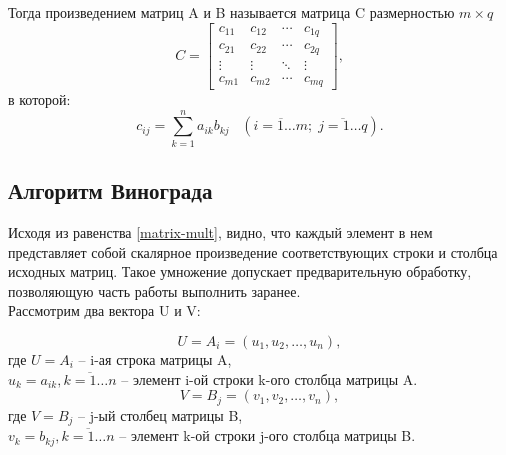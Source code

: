 \documentclass[12pt, a4paper]{report}
\begin{document}
	Тогда произведением матриц A и B называется матрица C размерностью  $m \times q$ 
	\begin{equation}
	\label{matrix-mult}
	C = \begin{bmatrix} 
	c_{11} & c_{12} & \cdots & c_{1q} \\
	c_{21} & c_{22} & \cdots & c_{2q} \\ 
	\vdots & \vdots & \ddots & \vdots \\ 
	c_{m1} & c_{m2} & \cdots & c_{mq}	
	\end{bmatrix},
	\end{equation}
	в которой:
	$$c_{ij} = \sum_{k=1}^n a_{ik}b_{kj} \;\;\; \left(\overline{i = 1 \ldots m};\;\overline{j = 1 \ldots q} \right).$$

	\subsection{Алгоритм Винограда}
	Исходя из равенства \ref{matrix-mult}, видно, что каждый элемент в нем представляет собой скалярное произведение соответствующих строки и столбца исходных матриц. Такое умножение допускает предварительную обработку, позволяющую часть работы выполнить заранее.\\
	Рассмотрим два вектора U и V:
	
	\begin{equation}
	\label{u-def}
	U = A_{i} = (u_{1}, u_{2}, \ldots, u_{n}),
	\end{equation}
	где $U = A_{i}$ -- i-ая строка матрицы A,\\
	$u_{k} = a_{ik}, \overline{k = 1 \ldots n}$ -- элемент i-ой строки k-ого столбца матрицы A.\\
	
	\begin{equation}
	\label{v-def}
	V = B_{j} = (v_{1}, v_{2}, \ldots, v_{n}),
	\end{equation}
	где $V = B_{j}$ -- j-ый столбец матрицы B,\\
	$v_{k} = b_{kj}, \overline{k = 1 \ldots n}$ -- элемент k-ой строки j-ого столбца матрицы B.\\
	
\end{document}
